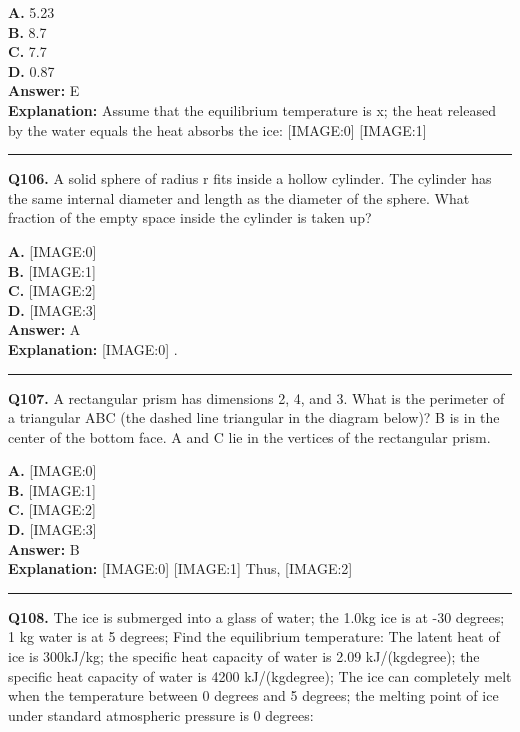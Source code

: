 \documentclass[12pt]{article}
\begin{document}
\textbf{A.} 5.23 \\
\textbf{B.} 8.7 \\
\textbf{C.} 7.7 \\
\textbf{D.} 0.87 \\

\textbf{Answer:} E \\
\textbf{Explanation:} Assume that the equilibrium temperature is x; the heat released by the water equals the heat absorbs the ice:
[IMAGE:0]
[IMAGE:1]

\hrule
\vspace{1em}


\noindent
\textbf{Q106.} A solid sphere of radius r fits inside a hollow cylinder. The cylinder has the same internal diameter and length as the diameter of the sphere. What fraction of the empty space inside the cylinder is taken up?



\textbf{A.} [IMAGE:0] \\
\textbf{B.} [IMAGE:1] \\
\textbf{C.} [IMAGE:2] \\
\textbf{D.} [IMAGE:3] \\

\textbf{Answer:} A \\
\textbf{Explanation:} [IMAGE:0]
.

\hrule
\vspace{1em}


\noindent
\textbf{Q107.} A rectangular prism has dimensions 2, 4, and 3. What is the perimeter of a triangular ABC (the dashed line triangular in the diagram below)? B is in the center of the bottom face. A and C lie in the vertices of the rectangular prism.



\textbf{A.} [IMAGE:0] \\
\textbf{B.} [IMAGE:1] \\
\textbf{C.} [IMAGE:2] \\
\textbf{D.} [IMAGE:3] \\

\textbf{Answer:} B \\
\textbf{Explanation:} [IMAGE:0]
[IMAGE:1]
Thus,
[IMAGE:2]

\hrule
\vspace{1em}


\noindent
\textbf{Q108.} The ice is submerged into a glass of water; the 1.0kg ice is at -30 degrees; 1 kg water is at 5 degrees; Find the equilibrium temperature: The latent heat of ice is 300kJ/kg; the specific heat capacity of water is 2.09 kJ/(kg\cdot degree); the specific heat capacity of water is 4200 kJ/(kg\cdot degree); The ice can completely melt when the temperature between 0 degrees and 5 degrees; the melting point of ice under standard atmospheric pressure is 0 degrees:
\end{document}
